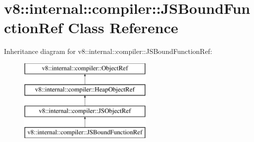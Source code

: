 \hypertarget{classv8_1_1internal_1_1compiler_1_1JSBoundFunctionRef}{}\section{v8\+:\+:internal\+:\+:compiler\+:\+:J\+S\+Bound\+Function\+Ref Class Reference}
\label{classv8_1_1internal_1_1compiler_1_1JSBoundFunctionRef}
Inheritance diagram for v8\+:\+:internal\+:\+:compiler\+:\+:J\+S\+Bound\+Function\+Ref\+:\begin{figure}[H]
\begin{center}
\leavevmode
\includegraphics[height=4.000000cm]{classv8_1_1internal_1_1compiler_1_1JSBoundFunctionRef}
\end{center}
\end{figure}
